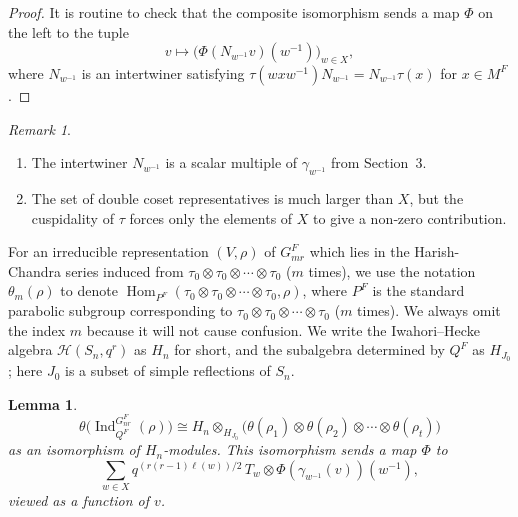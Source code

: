 \documentclass[12pt]{article}
\newtheorem{lemma}[theorem]{Lemma}
\theoremstyle{remark}
\newtheorem{remark}[theorem]{Remark}
\begin{document}
\begin{proof}
It is routine to check that the composite isomorphism sends a map $\Phi$ on the left to the tuple
$$
v \longmapsto \bigl( \Phi(N_{w^{-1}} v)(w^{-1}) \bigr)_{w \in X},
$$
where $N_{w^{-1}}$ is an intertwiner satisfying $\tau(w x w^{-1}) N_{w^{-1}} = N_{w^{-1}} \tau(x)$ for $x \in M^F$.
\end{proof}

\begin{remark}
\begin{enumerate}
\item The intertwiner $N_{w^{-1}}$ is a scalar multiple of $\gamma_{w^{-1}}$ from Section~3.
\item The set of double coset representatives is much larger than $X$, but the cuspidality of $\tau$ forces only the elements of $X$ to give a non‑zero contribution.
\end{enumerate}
\end{remark}

For an irreducible representation $(V,\rho)$ of $G_{mr}^F$ which lies in the Harish-Chandra series induced from $\tau_0 \otimes \tau_0 \otimes \cdots \otimes \tau_0$ ($m$ times), we use the notation $\theta_m(\rho)$ to denote $\operatorname{Hom}_{P^F}(\tau_0 \otimes \tau_0 \otimes \cdots \otimes \tau_0, \rho)$, where $P^F$ is the standard parabolic subgroup corresponding to $\tau_0 \otimes \tau_0 \otimes \cdots \otimes \tau_0$ ($m$ times). We always omit the index $m$ because it will not cause confusion. We write the Iwahori--Hecke algebra $\mathcal{H}(S_n,q^r)$ as $H_n$ for short, and the subalgebra determined by $Q^F$ as $H_{J_0}$; here $J_0$ is a subset of simple reflections of $S_n$.

\begin{lemma}
\label{lem:theta-induction}
$$
\theta\bigl(\operatorname{Ind}_{Q^F}^{G_{nr}^F}(\rho)\bigr) \cong H_n \otimes_{H_{J_0}} \bigl( \theta(\rho_1) \otimes \theta(\rho_2) \otimes \cdots \otimes \theta(\rho_t) \bigr)
$$
as an isomorphism of $H_n$-modules. This isomorphism sends a map $\Phi$ to
$$
\sum_{w \in X} q^{(r(r-1)\ell(w))/2} \, T_w \otimes \Phi(\gamma_{w^{-1}}(v))(w^{-1}),
$$
viewed as a function of $v$.
\end{lemma}
\end{document}
